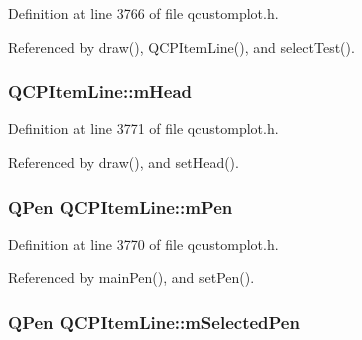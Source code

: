 Definition at line 3766 of file qcustomplot.\+h.



Referenced by draw(), Q\+C\+P\+Item\+Line(), and select\+Test().

\hypertarget{class_q_c_p_item_line_a51603f28ab7ddb1c1a95ea384791d3ed}{}
\subsubsection[{m\+Head}]{ Q\+C\+P\+Item\+Line\+::m\+Head\hspace{0.3cm}{\ttfamily [protected]}}\label{class_q_c_p_item_line_a51603f28ab7ddb1c1a95ea384791d3ed}


Definition at line 3771 of file qcustomplot.\+h.



Referenced by draw(), and set\+Head().

\hypertarget{class_q_c_p_item_line_abbb544d5bb927dfe4e81a7f3ca4c65ac}{}
\subsubsection[{m\+Pen}]{\setlength{\rightskip}{0pt plus 5cm}Q\+Pen Q\+C\+P\+Item\+Line\+::m\+Pen\hspace{0.3cm}{\ttfamily [protected]}}\label{class_q_c_p_item_line_abbb544d5bb927dfe4e81a7f3ca4c65ac}


Definition at line 3770 of file qcustomplot.\+h.



Referenced by main\+Pen(), and set\+Pen().

\hypertarget{class_q_c_p_item_line_aff858ad6dde3b90024814ca4b116f278}{}
\subsubsection[{m\+Selected\+Pen}]{\setlength{\rightskip}{0pt plus 5cm}Q\+Pen Q\+C\+P\+Item\+Line\+::m\+Selected\+Pen\hspace{0.3cm}{\ttfamily [protected]}}\label{class_q_c_p_item_line_aff858ad6dde3b90024814ca4b116f278}



